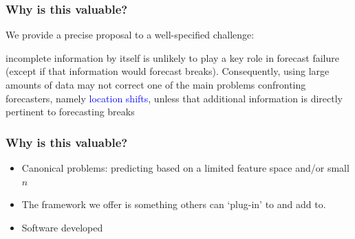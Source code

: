\documentclass[9pt]{beamer}
\theoremstyle{definition}
\begin{document}
    \begin{frame}
        \frametitle{Why is this valuable?}

        We provide a precise proposal to a well-specified challenge:

        \begin{myquote}[colback=red!30, size=small]incomplete information by itself is unlikely to play a key role in forecast failure (except if that information would forecast breaks). Consequently, using large amounts of data may not correct one of the main problems confronting forecasters, namely \textcolor{blue}{location shifts}, unless that additional information is directly pertinent to forecasting breaks \parencite[][]{castle2013forecasting}
        \end{myquote}

    \end{frame}

    \begin{frame}
        \frametitle{Why is this valuable?}

        \begin{itemize}
            \item Canonical problems: predicting based on a limited feature space and/or small $n$
    
            \bigskip
    
            \item The framework we offer is something others can `plug-in' to and add to.
            
    
            \bigskip
    
            \item Software developed
        \end{itemize}

    \end{frame}

\end{document}
